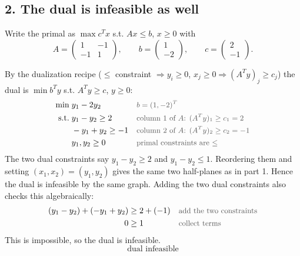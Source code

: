 \documentclass[a4paper,11pt]{article}
\newif\ifexplain
\newcommand{\teil}[1]{\subsection*{#1}}
\newcommand{\why}[1]{\text{\small\color{black!65}#1}}
\newcommand{\explain}[1]{\ifexplain\begin{erklbox}#1\end{erklbox}\fi}
\begin{document}
\teil{2. The dual is infeasible as well}
Write the primal as $\max c^Tx$ s.t. $Ax\le b$, $x\ge0$ with
\[
A = \begin{pmatrix}1&-1\\-1&1\end{pmatrix},\qquad b=\begin{pmatrix}1\\-2\end{pmatrix},\qquad c=\begin{pmatrix}2\\-1\end{pmatrix}.
\]
\explain{Die Dualisierung tauscht die Rollen: Aus $A$ wird $A^T$, aus $b$ wird die duale Zielfunktion, aus $c$ die rechte Seite der dualen Nebenbedingungen. Weil alle primalen Nebenbedingungen $\le$ sind, werden alle dualen Variablen $\ge0$; weil $x\ge0$ gilt, werden alle dualen Nebenbedingungen $\ge$.}
By the dualization recipe ($\le$ constraint $\Rightarrow y_i\ge0$, $x_j\ge0 \Rightarrow (A^Ty)_j\ge c_j$) the dual is $\min b^Ty$ s.t. $A^Ty\ge c$, $y\ge0$:
\begin{align*}
\min\;& y_1 - 2y_2 && \why{$b=(1,-2)^T$}\\
\text{s.t.}\;& y_1 - y_2 \ge 2 && \why{column 1 of $A$: $(A^Ty)_1 \ge c_1 = 2$}\\
& -y_1 + y_2 \ge -1 && \why{column 2 of $A$: $(A^Ty)_2 \ge c_2 = -1$}\\
& y_1, y_2 \ge 0 && \why{primal constraints are $\le$}
\end{align*}
The two dual constraints say $y_1-y_2\ge2$ and $y_1-y_2\le1$. Reordering them and setting $(x_1,x_2)=(y_1,y_2)$ gives the same two half-planes as in part 1. Hence the dual is infeasible by the same graph. Adding the two dual constraints also checks this algebraically:
\begin{align*}
(y_1 - y_2) + (-y_1 + y_2) &\ge 2 + (-1) && \why{add the two constraints}\\
0 &\ge 1 && \why{collect terms}
\end{align*}
This is impossible, so the dual is infeasible.
\[
\boxed{\text{dual infeasible}}
\]
\explain{Dasselbe Argument wie beim Primalen, nur mit vertauschten Zahlen: Die beiden dualen Nebenbedingungen sind $y_1-y_2\ge2$ und $y_1-y_2\le1$. Sie widersprechen sich genauso wie vorher $x_1-x_2\le1$ und $x_1-x_2\ge2$.}
\end{document}
